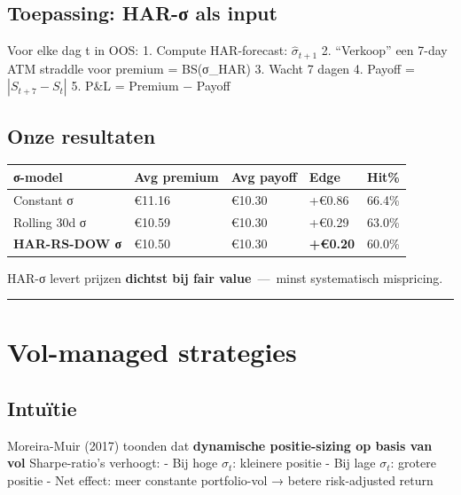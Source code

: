 \hypertarget{toepassing-har-ux3c3-als-input}{%
\subsection{Toepassing: HAR-σ als input}\label{toepassing-har-ux3c3-als-input}}

Voor elke dag t in OOS:
1. Compute HAR-forecast: \(\hat\sigma_{t+1}\)
2. ``Verkoop'' een 7-day ATM straddle voor premium = BS(σ\_HAR)
3. Wacht 7 dagen
4. Payoff = \(|S_{t+7} - S_t|\)
5. P\&L = Premium − Payoff

\hypertarget{onze-resultaten-2}{%
\subsection{Onze resultaten}\label{onze-resultaten-2}}

\begin{longtable}[]{@{}lllll@{}}
\toprule
σ-model & Avg premium & Avg payoff & Edge & Hit\% \\
\midrule
\endhead
Constant σ & €11.16 & €10.30 & +€0.86 & 66.4\% \\
Rolling 30d σ & €10.59 & €10.30 & +€0.29 & 63.0\% \\
\textbf{HAR-RS-DOW σ} & €10.50 & €10.30 & \textbf{+€0.20} & 60.0\% \\
\bottomrule
\end{longtable}

HAR-σ levert prijzen \textbf{dichtst bij fair value} \,---\, minst systematisch mispricing.

\begin{center}\rule{0.5\linewidth}{0.5pt}\end{center}

\hypertarget{vol-managed-strategies}{%
\section{Vol-managed strategies}\label{vol-managed-strategies}}

\hypertarget{intuuxeftie-12}{%
\subsection{Intuïtie}\label{intuuxeftie-12}}

Moreira-Muir (2017) toonden dat \textbf{dynamische positie-sizing op basis van vol} Sharpe-ratio's verhoogt:
- Bij hoge \(\sigma_t\): kleinere positie
- Bij lage \(\sigma_t\): grotere positie
- Net effect: meer constante portfolio-vol → betere risk-adjusted return

